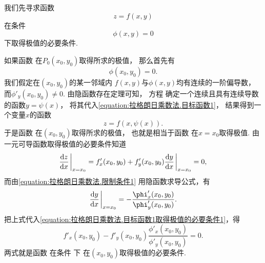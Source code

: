 我们先寻求函数
\begin{equation}\label{equation:拉格朗日乘数法.目标函数1}
	z=f(x,y)
\end{equation}
在条件
\begin{equation}\label{equation:拉格朗日乘数法.限制条件1}
	\phi(x,y)=0
\end{equation}
下取得极值的必要条件.

如果函数 
在\(P_0(x_0,y_0)\)取得所求的极值，
那么首先有
\begin{equation}\label{equation:拉格朗日乘数法.限制条件1在P0}
	\phi(x_0,y_0)=0.
\end{equation}
我们假定在\((x_0,y_0)\)的某一邻域内
\(f(x,y)\)与\(\phi(x,y)\)均有连续的一阶偏导数，
而\(\phi'_y(x_0,y_0)\neq0\).
由隐函数存在定理可知，
方程 
确定一个连续且具有连续导数的函数\(y=\psi(x)\)，
将其代入\cref{equation:拉格朗日乘数法.目标函数1}，
结果得到一个变量\(x\)的函数
\begin{equation}\label{equation:拉格朗日乘数法.目标函数1.代入限制条件1}
	z=f(x,\psi(x)).
\end{equation}
于是函数  在\((x_0,y_0)\)取得所求的极值，
也就是相当于函数  在\(x=x_0\)取得极值.
由一元可导函数取得极值的必要条件知道
\begin{equation}\label{equation:拉格朗日乘数法.目标函数1取得极值的必要条件1}
	\dv{z}{x}\eval_{x=x_0}
	= f'_x(x_0,y_0) + f'_y(x_0,y_0) \dv{y}{x}\eval_{x=x_0}
	= 0,
\end{equation}
而由\cref{equation:拉格朗日乘数法.限制条件1} 用隐函数求导公式，有\[
	\dv{y}{x}\eval_{x=x_0}
	= -\frac{\phi'_x(x_0,y_0)}{\phi'_y(x_0,y_0)}.
\]
把上式代入\cref{equation:拉格朗日乘数法.目标函数1取得极值的必要条件1}，得
\begin{equation}\label{equation:拉格朗日乘数法.目标函数1取得极值的必要条件2}
	f'_x(x_0,y_0) - f'_y(x_0,y_0) \frac{\phi'_x(x_0,y_0)}{\phi'_y(x_0,y_0)}
	= 0.
\end{equation}
两式就是函数 
在条件  下
在\((x_0,y_0)\)取得极值的必要条件.

